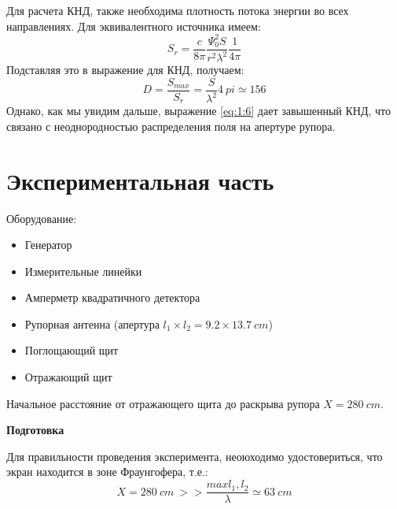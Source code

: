 Для расчета КНД, также необходима плотность потока энергии во всех направлениях. Для эквивалентного источника имеем:
\begin{equation}
    S_{r} = \frac{c}{8 \pi} \frac{\Psi_0^2 S}{r^2 \lambda^2} \frac{1}{4 \pi }
    \label{eq:1:5}
\end{equation}
Подставляя это в выражение для КНД, получаем:
\begin{equation}
    D = \frac{S_{max}}{S_r} = \frac{S}{\lambda^2} 4\ pi \simeq 156
    \label{eq:1:6}
\end{equation}
Однако, как мы увидим дальше, выражение \eqref{eq:1:6} дает завышенный КНД, что связано с неоднородностью распределения
поля на апертуре рупора.

\newpage
\section{Экспериментальная часть}
Оборудование: 
\begin{itemize}
    \item Генератор 
    \item Измерительные линейки 
    \item Амперметр квадратичного детектора 
    \item Рупорная антенна (апертура $l_1\times l_2 = 9.2 \times 13.7 ~ cm$)
    \item Поглощающий щит
    \item Отражающий щит
\end{itemize}
 
Начальное расстояние от отражающего щита до раскрыва рупора $X = 280~ cm$.

\textbf{Подготовка}

Для правильности проведения эксперимента, неоюходимо удостовериться, что экран находится в зоне Фраунгофера, т.е.:
\begin{equation}
    X = 280~cm~ >> \frac{max{l_1,l_2}}{\lambda} \simeq 63~cm 
    \label{eq:1:7}
\end{equation}

